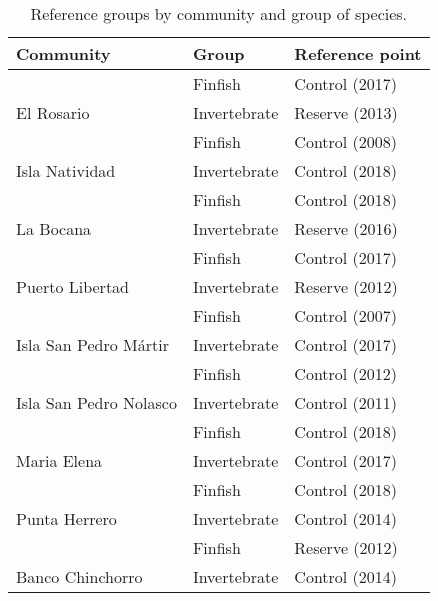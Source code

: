 \begin{table}[H]

\caption{\label{tab:ref_dict}Reference groups by community and group of species.}
\centering
\begin{tabular}[t]{lll}
\toprule
Community & Group & Reference point\\
\midrule
 & Finfish & Control (2017)\\
\cmidrule{2-3}
\multirow{-2}{*}{\raggedright\arraybackslash El Rosario} & Invertebrate & Reserve (2013)\\
\cmidrule{1-3}
 & Finfish & Control (2008)\\
\cmidrule{2-3}
\multirow{-2}{*}{\raggedright\arraybackslash Isla Natividad} & Invertebrate & Control (2018)\\
\cmidrule{1-3}
 & Finfish & Control (2018)\\
\cmidrule{2-3}
\multirow{-2}{*}{\raggedright\arraybackslash La Bocana} & Invertebrate & Reserve (2016)\\
\cmidrule{1-3}
 & Finfish & Control (2017)\\
\cmidrule{2-3}
\multirow{-2}{*}{\raggedright\arraybackslash Puerto Libertad} & Invertebrate & Reserve (2012)\\
\cmidrule{1-3}
 & Finfish & Control (2007)\\
\cmidrule{2-3}
\multirow{-2}{*}{\raggedright\arraybackslash Isla San Pedro Mártir} & Invertebrate & Control (2017)\\
\cmidrule{1-3}
 & Finfish & Control (2012)\\
\cmidrule{2-3}
\multirow{-2}{*}{\raggedright\arraybackslash Isla San Pedro Nolasco} & Invertebrate & Control (2011)\\
\cmidrule{1-3}
 & Finfish & Control (2018)\\
\cmidrule{2-3}
\multirow{-2}{*}{\raggedright\arraybackslash Maria Elena} & Invertebrate & Control (2017)\\
\cmidrule{1-3}
 & Finfish & Control (2018)\\
\cmidrule{2-3}
\multirow{-2}{*}{\raggedright\arraybackslash Punta Herrero} & Invertebrate & Control (2014)\\
\cmidrule{1-3}
 & Finfish & Reserve (2012)\\
\cmidrule{2-3}
\multirow{-2}{*}{\raggedright\arraybackslash Banco Chinchorro} & Invertebrate & Control (2014)\\
\bottomrule
\end{tabular}
\end{table}
